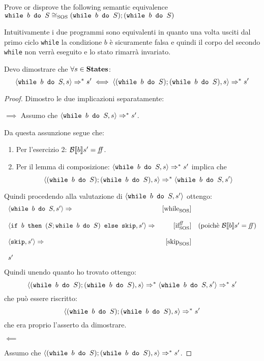 {Prove or disprove the following semantic equivalence
$\wbS{b}{S} \eqSOS (\wbS{b}{S}); (\wbS{b}{S})$	
}
{

Intuitivamente i due programmi sono equivalenti in quanto una volta usciti dal 
primo ciclo \texttt{while} la condizione $b$ è sicuramente falsa e quindi
il corpo del secondo \texttt{while} non verrà eseguito e lo stato rimarrà invariato.	
\vspace{10pt}	
	
	

Devo dimostrare che $\forall s \in \states$:
$$
\confSs{\wbS{b}{S}}{s} \Rar{*} s' \iff \confSs{(\wbS{b}{S}); (\wbS{b}{S})}{s} \Rar{*} s'
$$	
\begin{proof} Dimostro le due implicazioni separatamente:
	
\vspace{10pt}	
$\boxed{\implies}$
Assumo che $\confSs{\wbS{b}{S}}{s} \Rar{*} s'$.

Da questa assunzione segue che:
\begin{enumerate}
 \item Per l'esercizio 2: $\B{b}' = \semfalse$. 
 \item Per il lemma di composizione: $\confSs{\wbS{b}{S}}{s} \Rar{*} s'$ implica  che 
 $$\confSs{(\wbS{b}{S}); (\wbS{b}{S})}{s} \Rar{*} \confSs{\wbS{b}{S}}{s'}$$	
\end{enumerate}
Quindi procedendo alla valutazione di $\confSs{\wbS{b}{S}}{s'}$ ottengo:
$$
\begin{array}{lrr}
\confSs{\wbS{b}{S}}{s'} \Rar{} & \whileSOS & \\
& &\\
\confSs{\ifABC{b}{(S; \wbS{b}{S})}{\skipForFriends}}{s'} \Rar{} & \ifffSOS & (\text{poichè }\B{b}' = \semfalse)\\
& &\\
\confSs{\skipForFriends}{s'} \Rar{} & \skipSOS\\
& &\\
s' &\\
\end{array}
$$
Quindi unendo quanto ho trovato ottengo:
$$
\confSs{(\wbS{b}{S}); (\wbS{b}{S})}{s} \Rar{*} \confSs{\wbS{b}{S}}{s'} \Rar{*} s'
$$
che può essere riscritto: 
$$\confSs{(\wbS{b}{S}); (\wbS{b}{S})}{s} \Rar{*} s'$$
 che era proprio l'asserto da dimostrare.
\vspace{10pt}


$\boxed{\impliedby}$

Assumo che $\confSs{(\wbS{b}{S}); (\wbS{b}{S})}{s} \Rar{*} s'$.



\end{proof}}
